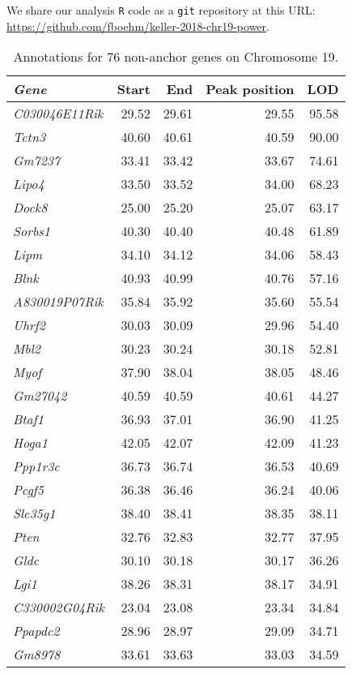 \documentclass[oneside]{book}
\begin{document}
We share our analysis \texttt{R} code \citep{r} as a \texttt{git} repository at this URL: \url{https://github.com/fboehm/keller-2018-chr19-power}.

\begin{table}[ht]
\caption{Annotations for 76 non-anchor genes on Chromosome 19.}\label{tab:ann76}
\centering
\begingroup\tiny
\begin{tabular}{>{\em}lrrrr}
  \hline
Gene & Start & End & Peak position & LOD \\
  \hline
C030046E11Rik & 29.52 & 29.61 & 29.55 & 95.58 \\
  Tctn3 & 40.60 & 40.61 & 40.59 & 90.00 \\
  Gm7237 & 33.41 & 33.42 & 33.67 & 74.61 \\
  Lipo4 & 33.50 & 33.52 & 34.00 & 68.23 \\
  Dock8 & 25.00 & 25.20 & 25.07 & 63.17 \\
  Sorbs1 & 40.30 & 40.40 & 40.48 & 61.89 \\
  Lipm & 34.10 & 34.12 & 34.06 & 58.43 \\
  Blnk & 40.93 & 40.99 & 40.76 & 57.16 \\
  A830019P07Rik & 35.84 & 35.92 & 35.60 & 55.54 \\
  Uhrf2 & 30.03 & 30.09 & 29.96 & 54.40 \\
  Mbl2 & 30.23 & 30.24 & 30.18 & 52.81 \\
  Myof & 37.90 & 38.04 & 38.05 & 48.46 \\
  Gm27042 & 40.59 & 40.59 & 40.61 & 44.27 \\
  Btaf1 & 36.93 & 37.01 & 36.90 & 41.25 \\
  Hoga1 & 42.05 & 42.07 & 42.09 & 41.23 \\
  Ppp1r3c & 36.73 & 36.74 & 36.53 & 40.69 \\
  Pcgf5 & 36.38 & 36.46 & 36.24 & 40.06 \\
  Slc35g1 & 38.40 & 38.41 & 38.35 & 38.11 \\
  Pten & 32.76 & 32.83 & 32.77 & 37.95 \\
  Gldc & 30.10 & 30.18 & 30.17 & 36.26 \\
  Lgi1 & 38.26 & 38.31 & 38.17 & 34.91 \\
  C330002G04Rik & 23.04 & 23.08 & 23.34 & 34.84 \\
  Ppapdc2 & 28.96 & 28.97 & 29.09 & 34.71 \\
  Gm8978 & 33.61 & 33.63 & 33.03 & 34.59 \\

\end{tabular}
\end{table}
\end{document}
